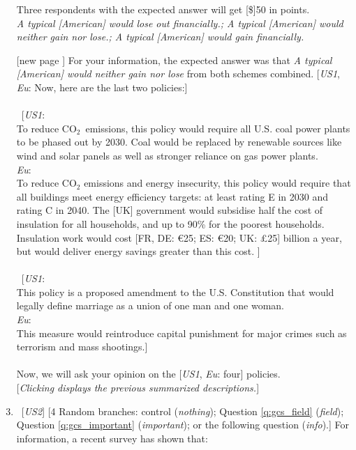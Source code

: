 \documentclass[12pt,english]{article}
\begin{document}
\begin{enumerate}[resume]
Three respondents with the expected answer will get [\$]50 in points.
\\ \textit{A typical [American] would lose out financially.; A typical [American] would neither gain nor lose.; A typical [American] would gain financially.}
\item[[new page\!\!\!]] For your information, the expected answer was that \textit{A typical [American] would neither gain nor lose} from both schemes combined. [\textit{US1}, \textit{Eu}: Now, here are the last two policies:]~ \\
\\
~[\textit{US1}: \textbf{} \\To reduce CO$_\text{2}$~emissions, this policy would require all U.S. coal power plants to be phased out by 2030. Coal would be replaced by renewable sources like wind and solar panels as well as stronger reliance on gas power plants.\\
\textit{Eu}: \textbf{}\\ To reduce CO$_\text{2}$ emissions and energy insecurity, this policy would require that all buildings meet energy efficiency targets: at least rating E in 2030 and rating C in 2040. 
The [UK] government would subsidise half the cost of insulation for all households, and up to 90\% for the poorest households. Insulation work would cost [FR, DE: \euro{}25; ES: \euro{}20; UK: £25] billion a year, but would deliver energy savings greater than this cost.
]~\\
\\
~[\textit{US1}: \textbf{}\\
This policy is a proposed amendment to the U.S. Constitution that would legally define marriage as a union of one man and one woman. \\
\textit{Eu}: \textbf{} \\This measure would reintroduce capital punishment for major crimes such as terrorism and mass shootings.]~\\
\\
Now, we will ask your opinion on the [\textit{US1}, \textit{Eu}: four] policies.\\
 [\textit{Clicking displays the previous summarized descriptions.}]
\item ~[\textit{US2}] [4 Random branches: control (\textit{nothing}); Question \ref{q:gcs_field} (\textit{field}); Question \ref{q:gcs_important} (\textit{important}); or the following question (\textit{info}).] \label{q:info_support} For information, a recent survey has shown that:

\end{enumerate}
\end{document}
